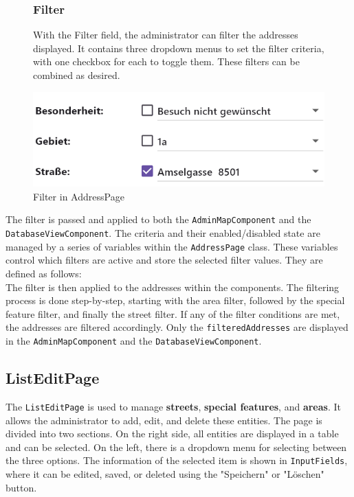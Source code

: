 \begin{figure}[H]
    \centering
    \begin{minipage}{0.55\textwidth} %
        \subsubsection{Filter}
        With the Filter field, the administrator can filter the addresses displayed. It contains three dropdown menus to set the filter criteria, with one checkbox for each to toggle them. These filters can be combined as desired. 
    \end{minipage}
    \hfill 
    \begin{minipage}{0.4\textwidth} %
        \centering
        \includegraphics[width=\linewidth]{images/AdminPanel/FilterField.png}
        \caption{Filter in AddressPage}
        \label{fig:adminpanel_filter}
    \end{minipage}
\end{figure}

\newpage

The filter is passed and applied to both the \texttt{AdminMapComponent} and the \texttt{DatabaseViewComponent}. The criteria and their enabled/disabled state are managed by a series of variables within the \texttt{AddressPage} class. These variables control which filters are active and store the selected filter values. They are defined as follows:\\

The filter is then applied to the addresses within the components. The filtering process is done step-by-step, starting with the area filter, followed by the special feature filter, and finally the street filter. If any of the filter conditions are met, the addresses are filtered accordingly. Only the \texttt{filteredAddresses} are displayed in the \texttt{AdminMapComponent} and the \texttt{DatabaseViewComponent}.
 

\subsection{ListEditPage}
The \texttt{ListEditPage} is used to manage \textbf{streets}, \textbf{special features}, and \textbf{areas}. It allows the administrator to add, edit, and delete these entities. The page is divided into two sections. On the right side, all entities are displayed in a table and can be selected. On the left, there is a dropdown menu for selecting between the three options. The information of the selected item is shown in \texttt{InputFields}, where it can be edited, saved, or deleted using the "Speichern" or "Löschen" button.


